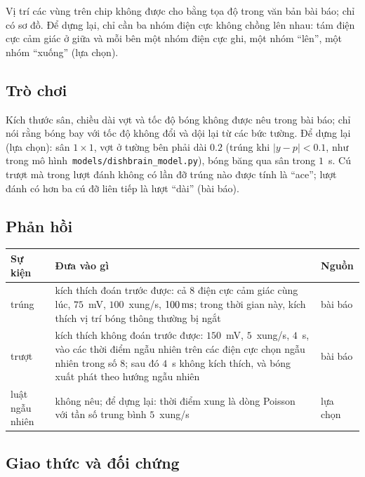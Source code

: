 Vị trí các vùng trên chip không được cho bằng tọa độ trong văn bản bài báo; chỉ có sơ đồ. Để dựng lại, chỉ cần ba nhóm điện cực không chồng lên nhau: tám điện cực cảm giác ở giữa và mỗi bên một nhóm điện cực ghi, một nhóm ``lên'', một nhóm ``xuống'' (lựa chọn).

\subsection*{Trò chơi}

Kích thước sân, chiều dài vợt và tốc độ bóng không được nêu trong bài báo; chỉ nói rằng bóng bay với tốc độ không đổi và dội lại từ các bức tường. Để dựng lại (lựa chọn): sân $1\times1$, vợt ở tường bên phải dài $0.2$ (trúng khi $|y-p|<0.1$, như trong mô hình~\texttt{models/dishbrain\_model.py}), bóng băng qua sân trong $1$~s. Cú trượt mà trong lượt đánh không có lần đỡ trúng nào được tính là ``ace''; lượt đánh có hơn ba cú đỡ liên tiếp là lượt ``dài'' (bài báo).

\subsection*{Phản hồi}

\begin{center}
\footnotesize
\setlength{\tabcolsep}{4pt}
\renewcommand{\arraystretch}{1.15}
\begin{tabular}{>{\raggedright}p{2.6cm}>{\raggedright}p{8.3cm}>{\raggedright\arraybackslash}p{1.6cm}}
\toprule
Sự kiện & Đưa vào gì & Nguồn \\
\midrule
trúng & kích thích đoán trước được: cả $8$ điện cực cảm giác cùng lúc, $75$~mV, $100$~xung/s, $100\,\text{ms}$; trong thời gian này, kích thích vị trí bóng thông thường bị ngắt & bài báo \\
trượt & kích thích không đoán trước được: $150$~mV, $5$~xung/s, $4$~s, vào các thời điểm ngẫu nhiên trên các điện cực chọn ngẫu nhiên trong số $8$; sau đó $4$~s không kích thích, và bóng xuất phát theo hướng ngẫu nhiên & bài báo \\
luật ngẫu nhiên & không nêu; để dựng lại: thời điểm xung là dòng Poisson với tần số trung bình $5$~xung/s & lựa chọn \\
\bottomrule
\end{tabular}
\end{center}

\subsection*{Giao thức và đối chứng}

